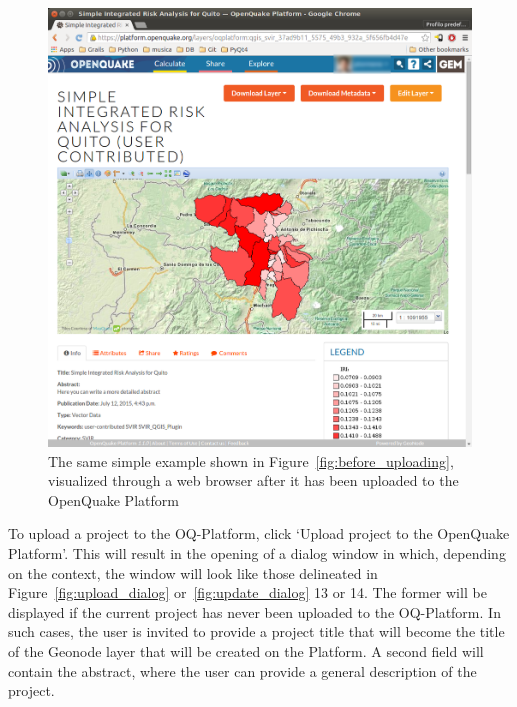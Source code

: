 \begin{figure}
    \centering
    \includegraphics[width=\textwidth]{../images/image10}
    \caption{The same simple example shown in
    Figure~\ref{fig:before_uploading}, visualized through a web browser after
    it has been uploaded to the OpenQuake Platform}
    \label{fig:after_uploading}
\end{figure}

To upload a project to the OQ-Platform, click `Upload project to the OpenQuake
Platform'. This will result in the opening of a dialog window in which,
depending on the context, the window will look like those delineated in
Figure~\ref{fig:upload_dialog} or~\ref{fig:update_dialog} 13 or 14. The former
will be displayed if the current project has never been uploaded to the
OQ-Platform. In such cases, the user is invited to provide a project title that
will become the title of the Geonode layer that will be created on the
Platform. A second field will contain the abstract, where the user can provide
a general description of the project.

